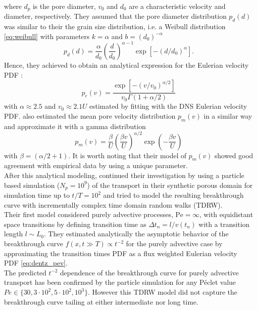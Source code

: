 where $d_p$ is the pore diameter, $v_0$ and $d_0$ are a characteristic velocity and diameter, respectively.
They assumed that the pore diameter distribution $p_d(d)$ was similar to their the grain size distribution, i.e. a Weibull distribution \eqref{eq:weibull} with parameters $k=\alpha$ and $b=(d_0)^{-\alpha}$
\[
p_d(d)=\frac{\alpha}{d_0}\left(\frac{d}{d_0}\right)^{\alpha-1}\exp[-(d/d_0)^\alpha].
\]
Hence, they achieved to obtain an analytical expression for the Eulerian velocity PDF :
\begin{equation}\label{eq:dentz_pev}
p_e(v)=\frac{\exp[-(v/v_0)^{\alpha/2}]}{v_0\Gamma(1+\alpha/2)}
\end{equation}
with $\alpha\approx2.5$ and $v_0\approx2.1U$ estimated by fitting with the DNS Eulerian velocity PDF.
\citeauthor{Dentz2017} also estimated the mean pore velocity distribution $p_m(v)$ in a similar way and approximate it with a gamma distribution
\begin{equation}\label{eq:dentz_pmv}
p_m(v)=\frac{\beta}{U}\left(\frac{\beta v}{U}\right)^{\alpha/2}\exp\left(-\frac{\beta v}{U}\right) 
\end{equation}
with $\beta=(\alpha/2+1)$. 
It is worth noting that their model of $p_m(v)$ showed good agreement with empirical data by using a unique parameter.\\
After this analytical modeling, \citeauthor{Dentz2017} continued their investigation by using a particle based simulation ($N_p=10^9$) of the transport in their synthetic porous domain for simulation time up to $t/T=10^2$ and tried to model the resulting breakthrough curve with incrementally complex time domain random walks (TDRW).\\
Their first model considered purely advective processes, $\mathrm{Pe}=\infty$, with equidistant space transitions by defining transition time as $\Delta t_n=l/v(t_n)$ with a transition length  $l\sim L_0$. 
They estimated analytically the asymptotic behavior of the breakthrough curve $f(x,t\gg T)\propto t^{-2}$ for the purely advective case by approximating the transition times PDF as a flux weighted Eulerian velocity PDF \eqref{eq:dentz_pev}.\\
The predicted $t^{-2}$ dependence of the breakthrough curve for purely advective transport has been confirmed by the particle simulation for any Péclet value $Pe\in\{30, 3\cdot10^2, 5\cdot10^2, 10^3\}$. However this TDRW model did not capture the breakthrough curve tailing at either intermediate nor long time.\\
